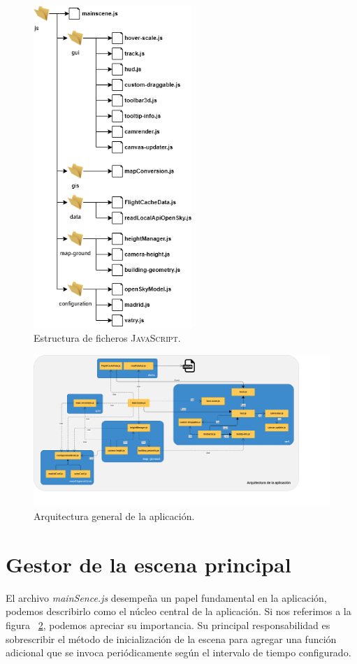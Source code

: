 \documentclass[a4paper, 11pt]{book}
\begin{document}
\begin{figure}[h]
  \centering
  \includegraphics[width=6cm, keepaspectratio]{img/ficheros.drawio.png}
  \caption{Estructura de ficheros \textsc{JavaScript}.}
  \label{fig:javascriptFiles}
\end{figure}

\begin{center}
\begin{figure}[h]
  \centering
  \includegraphics[width=18cm, keepaspectratio]{img/Arquitectura.png}
  \caption{Arquitectura general de la aplicación.}
  \label{fig:arquitectura}
\end{figure}
\end{center}
\section{Gestor de la escena principal}
\label{sec:mainScene.js}
El archivo \emph{mainSence.js} desempeña un papel fundamental en la aplicación, podemos describirlo como el núcleo central de la aplicación. Si nos referimos a la figura ~\ref{fig:arquitectura}, podemos apreciar su importancia. Su principal responsabilidad es sobrescribir el método de inicialización de la escena para agregar una función adicional que se invoca periódicamente según el intervalo de tiempo configurado.
\end{document}
